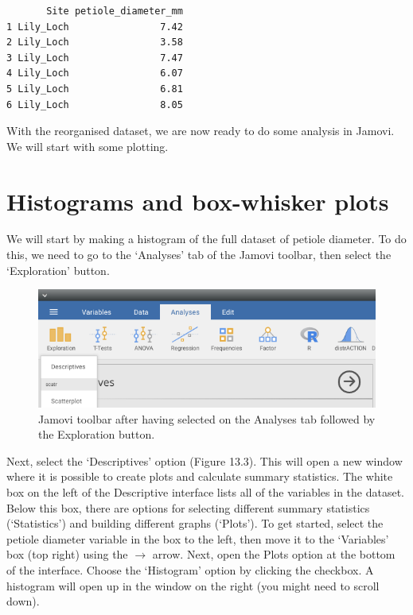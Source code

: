 \documentclass[
]{scrbook}
\begin{document}
\begin{verbatim}
       Site petiole_diameter_mm
1 Lily_Loch                7.42
2 Lily_Loch                3.58
3 Lily_Loch                7.47
4 Lily_Loch                6.07
5 Lily_Loch                6.81
6 Lily_Loch                8.05
\end{verbatim}

With the reorganised dataset, we are now ready to do some analysis in Jamovi.
We will start with some plotting.

\hypertarget{histograms-and-box-whisker-plots}{%
\section{Histograms and box-whisker plots}\label{histograms-and-box-whisker-plots}}

We will start by making a histogram of the full dataset of petiole diameter.
To do this, we need to go to the `Analyses' tab of the Jamovi toolbar, then select the `Exploration' button.

\begin{figure}
\includegraphics[width=1\linewidth]{img/lilypad_descriptives} \caption{Jamovi toolbar after having selected on the Analyses tab followed by the Exploration button.}\label{fig:unnamed-chunk-50}
\end{figure}

Next, select the `Descriptives' option (Figure 13.3).
This will open a new window where it is possible to create plots and calculate summary statistics.
The white box on the left of the Descriptive interface lists all of the variables in the dataset.
Below this box, there are options for selecting different summary statistics (`Statistics') and building different graphs (`Plots').
To get started, select the petiole diameter variable in the box to the left, then move it to the `Variables' box (top right) using the \(\to\) arrow.
Next, open the Plots option at the bottom of the interface.
Choose the `Histogram' option by clicking the checkbox.
A histogram will open up in the window on the right (you might need to scroll down).
\end{document}
